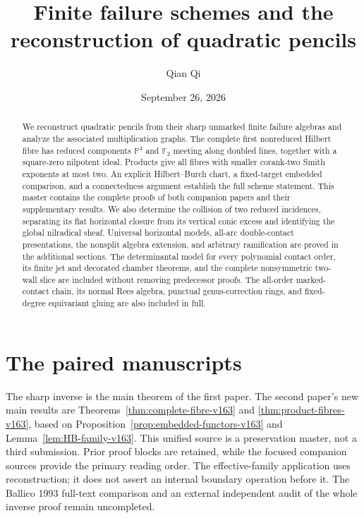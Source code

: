 \documentclass[11pt,reqno]{amsart}
\numberwithin{equation}{section}
\theoremstyle{definition}\newtheorem{definition}[theorem]{Definition}
\theoremstyle{remark}\newtheorem{remark}[theorem]{Remark}
\newcommand{\Pj}{\mathbb P}\newcommand{\A}{\mathbb A}
\begin{document}
\title[Finite failure schemes and quadratic pencils]{Finite failure schemes and the reconstruction of quadratic pencils}
\author{Qian Qi}
\date{September 26, 2026}
\begin{abstract}
We reconstruct quadratic pencils from their sharp unmarked finite
failure algebras and analyze the associated multiplication graphs.
The complete first nonreduced Hilbert fibre has reduced components
$\Pj^4$ and $\mathbb F_2$ meeting along doubled lines, together with
a square-zero nilpotent ideal. Products give all fibres with smaller
corank-two Smith exponents at most two. An explicit Hilbert--Burch
chart, a fixed-target embedded comparison, and a connectedness
argument establish the full scheme statement. This master contains
the complete proofs of both companion papers and their supplementary
results. We also determine the collision of
two reduced incidences, separating its flat horizontal closure from
its vertical conic excess and identifying the global nilradical sheaf.
Universal horizontal models, all-arc double-contact presentations,
the nonsplit algebra extension, and arbitrary ramification are
proved in the additional sections.
The determinantal model for every polynomial contact order, its finite
jet and decorated chamber theorems, and the complete nonsymmetric
two-wall slice are included without removing predecessor proofs.
The all-order marked-contact chain, its normal Rees algebra,
punctual genus-correction rings, and fixed-degree equivariant gluing
are also included in full.
\end{abstract}
\maketitle
\section*{The paired manuscripts}
\label{sec:introduction-v153}
The sharp inverse is the main theorem of the first paper. The second
paper's new main results are
Theorems~\ref{thm:complete-fibre-v163} and
\ref{thm:product-fibres-v163}, based on
Proposition~\ref{prop:embedded-functors-v163} and
Lemma~\ref{lem:HB-family-v163}. This unified source is a preservation
master, not a third submission. Prior proof blocks are retained,
while the focused companion sources provide the primary reading order.
The effective-family application uses reconstruction; it does not
assert an internal boundary operation before it. The Ballico 1993
full-text comparison and an external independent audit of the whole
inverse proof remain uncompleted.
\end{document}
